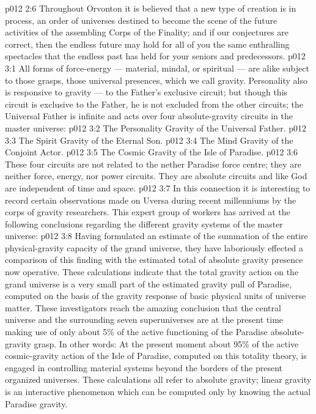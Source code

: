 \vs p012 2:6 Throughout Orvonton it is believed that a new type of creation is in process, an order of universes destined to become the scene of the future activities of the assembling Corps of the Finality; and if our conjectures are correct, then the endless future may hold for all of you the same enthralling spectacles that the endless past has held for your seniors and predecessors.
\vs p012 3:1 All forms of force\hyp{}energy --- material, mindal, or spiritual --- are alike subject to those grasps, those universal presences, which we call gravity. Personality also is responsive to gravity --- to the Father’s exclusive circuit; but though this circuit is exclusive to the Father, he is not excluded from the other circuits; the Universal Father is infinite and acts over  four absolute\hyp{}gravity circuits in the master universe:
\vs p012 3:2 \bibnobreakspace The Personality Gravity of the Universal Father.
\vs p012 3:3 \bibnobreakspace The Spirit Gravity of the Eternal Son.
\vs p012 3:4 \bibnobreakspace The Mind Gravity of the Conjoint Actor.
\vs p012 3:5 \bibnobreakspace The Cosmic Gravity of the Isle of Paradise.
\vs p012 3:6 \pc These four circuits are not related to the nether Paradise force centre; they are neither force, energy, nor power circuits. They are absolute  circuits and like God are independent of time and space.
\vs p012 3:7 In this connection it is interesting to record certain observations made on Uversa during recent millenniums by the corps of gravity researchers. This expert group of workers has arrived at the following conclusions regarding the different gravity systems of the master universe:
\vs p012 3:8 \bibnobreakspace {} Having formulated an estimate of the summation of the entire physical\hyp{}gravity capacity of the grand universe, they have laboriously effected a comparison of this finding with the estimated total of absolute gravity presence now operative. These calculations indicate that the total gravity action on the grand universe is a very small part of the estimated gravity pull of Paradise, computed on the basis of the gravity response of basic physical units of universe matter. These investigators reach the amazing conclusion that the central universe and the surrounding seven superuniverses are at the present time making use of only about 5\% of the active functioning of the Paradise absolute\hyp{}gravity grasp. In other words: At the present moment about 95\% of the active cosmic\hyp{}gravity action of the Isle of Paradise, computed on this totality theory, is engaged in controlling material systems beyond the borders of the present organized universes. These calculations all refer to absolute gravity; linear gravity is an interactive phenomenon which can be computed only by knowing the actual Paradise gravity.
